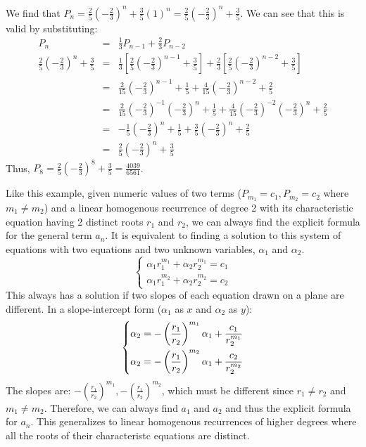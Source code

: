 \documentclass[12pt, oneside]{article}
\begin{document}
We find that $\displaystyle P_n = \frac{2}{5}\left(-\frac{2}{3}\right)^n + \frac{3}{5}(1)^n = \frac{2}{5}\left(-\frac{2}{3}\right)^n + \frac{3}{5}$. We can see that this is valid by substituting:
\begin{eqnarray*}
P_n & = & \frac{1}{3}P_{n-1} + \frac{2}{3}P_{n-2}\\
\frac{2}{5}\left(-\frac{2}{3}\right)^n + \frac{3}{5} & = & \frac{1}{3}[\frac{2}{5}\left(-\frac{2}{3}\right)^{n-1} + \frac{3}{5}] + \frac{2}{3}[\frac{2}{5}\left(-\frac{2}{3}\right)^{n-2} + \frac{3}{5}]\\
& = & \frac{2}{15}\left(-\frac{2}{3}\right)^{n-1} + \frac{1}{5} + \frac{4}{15}\left(-\frac{2}{3}\right)^{n-2} + \frac{2}{5}\\
& = & \frac{2}{15}\left(-\frac{2}{3}\right)^{-1}\left(-\frac{2}{3}\right)^n + \frac{1}{5} + \frac{4}{15}\left(-\frac{2}{3}\right)^{-2}\left(-\frac{2}{3}\right)^n + \frac{2}{5}\\
& = & -\frac{1}{5}\left(-\frac{2}{3}\right)^n + \frac{1}{5} + \frac{3}{5}\left(-\frac{2}{3}\right)^n + \frac{2}{5}\\
& = & \frac{2}{5}\left(-\frac{2}{3}\right)^n + \frac{3}{5}
\end{eqnarray*}
Thus, $\displaystyle P_8 = \frac{2}{5}\left(-\frac{2}{3}\right)^8 + \frac{3}{5} = \frac{4039}{6561}$.

Like this example, given numeric values of two terms ($P_{m_1} = c_1, P_{m_2} = c_2$ where $m_1 \neq m_2$) and a linear homogenous recurrence of degree 2 with its characteristic equation having 2 distinct roots $r_1$ and $r_2$, we can always find the explicit formula for the general term $a_n$. It is equivalent to finding a solution to this system of equations with two equations and two unknown variables, $\alpha_1$ and $\alpha_2$.
\[
\begin{cases}
\alpha_1 r_1^{m_1} + \alpha_2 r_2^{m_1} = c_1\\
\alpha_1 r_1^{m_2} + \alpha_2 r_2^{m_2} = c_2
\end{cases}
\]
This always has a solution if two slopes of each equation drawn on a plane are different. In a slope-intercept form ($\alpha_1$ as $x$ and $\alpha_2$ as $y$):
\[
\begin{dcases}
\alpha_2 = -\left(\frac{r_1}{r_2}\right)^{m_1}\alpha_1 + \frac{c_1}{r_2^{m_1}}\\
\alpha_2 = -\left(\frac{r_1}{r_2}\right)^{m_2}\alpha_1 + \frac{c_2}{r_2^{m_2}}\\
\end{dcases}
\]
The slopes are: $\displaystyle -\left(\frac{r_1}{r_2}\right)^{m_1}, -\left(\frac{r_1}{r_2}\right)^{m_2}$, which must be different since $r_1 \neq r_2$ and $m_1 \neq m_2$. Therefore, we can always find $a_1$ and $a_2$ and thus the explicit formula for $a_n$. This generalizes to linear homogenous recurrences of higher degrees where all the roots of their characteristc equations are distinct.
\end{document}
